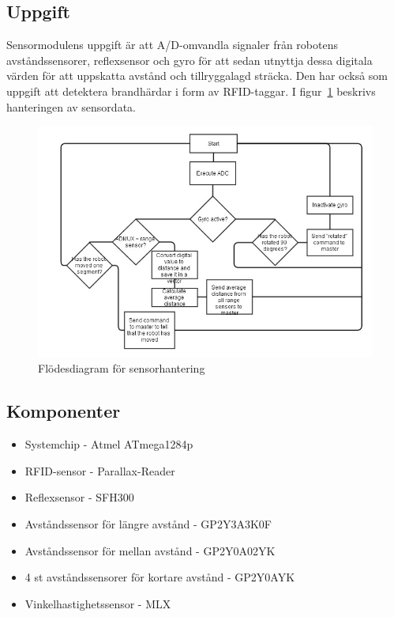 \documentclass[a4paper,12pt,fleqn]{article}
\begin{document}
\subsection{Uppgift}
Sensormodulens uppgift är att A/D-omvandla signaler från robotens avståndssensorer, reflexsensor och gyro för att sedan utnyttja dessa digitala värden för att uppskatta avstånd och tillryggalagd sträcka. Den har också som uppgift att detektera brandhärdar i form av RFID-taggar. I figur~\ref{fig:sensorflow} beskrivs hanteringen av sensordata.

\begin{figure}[htp] %
  \begin{center}
  \includegraphics[keepaspectratio=true,width=0.6\linewidth]{bilder/sensorflode}  %
  \end{center}
  \caption{Flödesdiagram för sensorhantering} %
  \label{fig:sensorflow}
\end{figure}

\subsection{Komponenter}
\begin{itemize}
	\item Systemchip - Atmel ATmega1284p
	\item RFID-sensor - Par\-all\-ax-Read\-er\
	\item Reflexsensor - SFH300
	\item Avståndssensor för längre avstånd - GP\-2Y3A\-3K\-0F
	\item Avståndssensor för mellan avstånd - GP2Y0A02YK
	\item 4 st avståndssensorer för kortare avstånd - GP\-2Y\-0A\-YK
	\item Vinkelhastighetssensor - MLX\-90\-609
\end{itemize}
~\\
\end{document}
